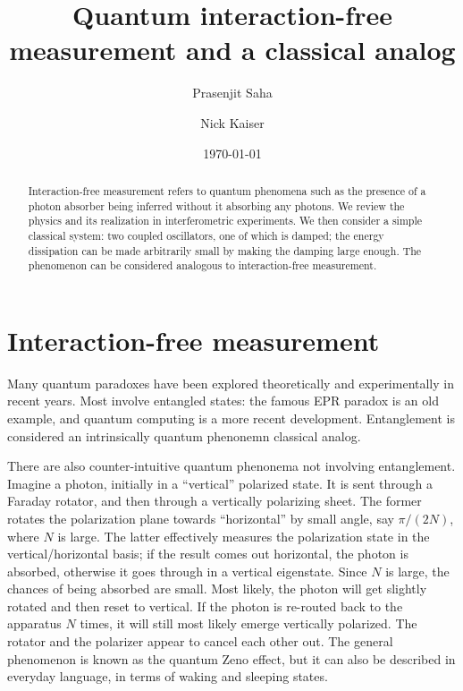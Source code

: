 \documentclass[12pt,aps,prb,preprint]{revtex4}
\begin{document}
\title{Quantum interaction-free measurement and a classical analog}

\author{Prasenjit Saha}
\author{Nick Kaiser}

\date{\today}

\begin{abstract}
Interaction-free measurement refers to quantum phenomena such as the
presence of a photon absorber being inferred without it absorbing any
photons.  We review the physics and its realization in interferometric
experiments.  We then consider a simple classical system: two coupled
oscillators, one of which is damped; the energy dissipation can be
made arbitrarily small by making the damping large enough.  The
phenomenon can be considered analogous to interaction-free
measurement.
\end{abstract}

\maketitle

\section{Interaction-free measurement}

Many quantum paradoxes have been explored theoretically and
experimentally in recent years.  Most involve entangled states: the
famous EPR paradox is an old example, and quantum computing is a more
recent development\cite{2007qucosc.book}.  Entanglement is considered
an intrinsically quantum phenonemn classical analog.

There are also counter-intuitive quantum phenonema not involving
entanglement.  Imagine a photon, initially in a ``vertical'' polarized
state.  It is sent through a Faraday rotator, and then through a
vertically polarizing sheet.  The former rotates the polarization
plane towards ``horizontal'' by small angle, say $\pi/(2N)$, where $N$
is large.  The latter effectively measures the polarization state in
the vertical/horizontal basis; if the result comes out horizontal, the
photon is absorbed, otherwise it goes through in a vertical
eigenstate.  Since $N$ is large, the chances of being absorbed are
small.  Most likely, the photon will get slightly rotated and then
reset to vertical.  If the photon is re-routed back to the apparatus
$N$ times, it will still most likely emerge vertically polarized.  The
rotator and the polarizer appear to cancel each other out.  The
general phenomenon is known as the quantum Zeno
effect,\cite{PhysRevA.41.2295} but it can also be described in
everyday language, in terms of waking and sleeping
states.\cite{orzel2009teach}
\end{document}
